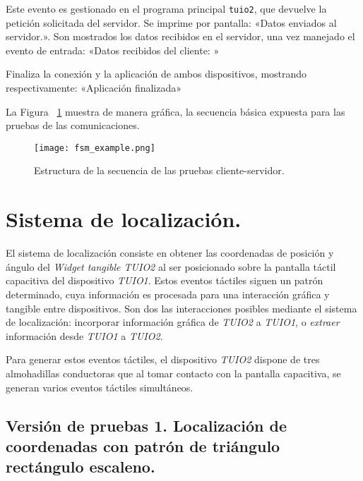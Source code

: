 Este evento es gestionado en el programa principal \texttt{tuio2}, que devuelve la petición solicitada del servidor. Se imprime por pantalla: «Datos enviados al servidor.». Son mostrados los datos recibidos en el servidor, una vez manejado el evento de entrada: «Datos recibidos del cliente: » 

Finaliza la conexión y la aplicación de ambos dispositivos, mostrando respectivamente: «Aplicación finalizada»

La Figura ~\ref{fig:fsmexample} muestra de manera gráfica, la secuencia básica expuesta para las pruebas de las comunicaciones.

\begin{figure}[!h]
\begin{center}
\texttt{[image: fsm\_example.png]}
\caption{Estructura de la secuencia de las pruebas cliente-servidor.}
\label{fig:fsmexample}
\end{center}
\end{figure}


\section{Sistema de localización.}
El sistema de localización consiste en obtener las coordenadas de posición y ángulo del \emph{Widget tangible TUIO2} al ser posicionado sobre la pantalla táctil capacitiva del dispositivo \emph{TUIO1}. Estos eventos táctiles siguen un patrón determinado, cuya información es procesada para una interacción gráfica y tangible entre dispositivos.
Son dos las interacciones posibles mediante el sistema de localización: incorporar información gráfica de \emph{TUIO2} a \emph{TUIO1}, o \emph{extraer} información desde \emph{TUIO1} a \emph{TUIO2}.

Para generar estos eventos táctiles, el dispositivo \emph{TUIO2} dispone de tres almohadillas conductoras que al tomar contacto con la pantalla capacitiva, se generan varios eventos táctiles simultáneos.

\subsection{Versión de pruebas 1. Localización de coordenadas con patrón de triángulo rectángulo escaleno.}  

